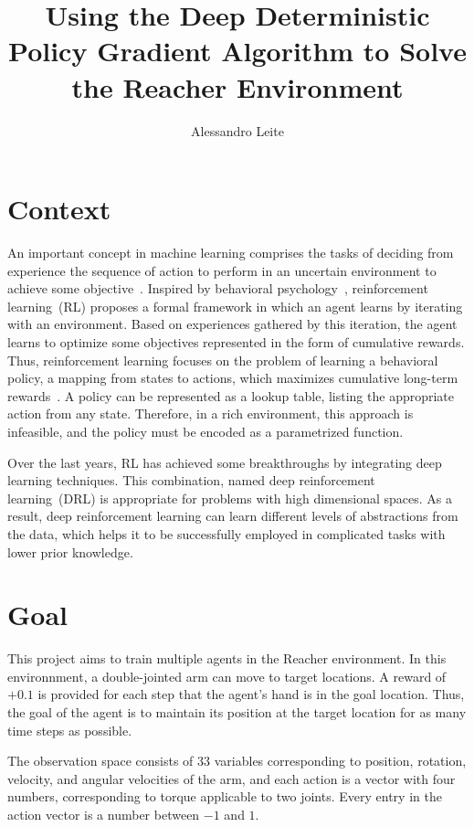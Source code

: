 \documentclass[12pt,english]{article}
\title{Using the Deep Deterministic Policy Gradient Algorithm to Solve the Reacher Environment}
\author{Alessandro Leite}
\date{}
\begin{document}
\maketitle
\thispagestyle{plain}
\vspace{-60pt}

\section{Context}\label{sec:introduction}

An important concept in machine learning comprises the tasks of deciding from experience the sequence of action to perform in an uncertain environment to achieve some objective~\cite{francois:18}. Inspired by behavioral psychology~\cite{sutton:18}, reinforcement learning~(RL) proposes a formal framework in which an agent learns by iterating with an environment. Based on experiences gathered by this iteration, the agent learns to optimize some objectives represented in the form of cumulative rewards. Thus, reinforcement learning focuses on the problem of learning a behavioral policy, a mapping from states to actions, which maximizes cumulative long-term rewards~\cite{sutton:18}. A policy can be represented as a lookup table, listing the appropriate action from any state. Therefore, in a rich environment, this approach is infeasible, and the policy must be encoded as a parametrized function.

Over the last years, RL has achieved some breakthroughs by integrating deep learning techniques. This combination, named deep reinforcement learning~(DRL) is appropriate for problems with high dimensional spaces. As a result, deep reinforcement learning can learn different levels of abstractions from the data, which helps it to be successfully employed in complicated tasks with lower prior knowledge.   

\section{Goal}

This project aims to train multiple agents in the Reacher environment. In this environnment, a double-jointed arm can move to target locations. A reward of \(+0.1\) is provided for each step that the agent's hand is in the goal location. Thus, the goal of the agent is to maintain its position at the target location for as many time steps as possible.

The observation space consists of 33 variables corresponding to position, rotation, velocity, and angular velocities of the arm, and each action is a vector with four numbers, corresponding to torque applicable to two joints. Every entry in the action vector is a number between \(-1\) and \(1\). 
\end{document}
